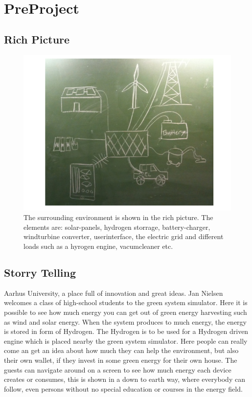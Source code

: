 \section{PreProject}
\subsection{Rich Picture}

\begin{figure}[h!]		%
 \begin{centering}
  \includegraphics[width=1\textwidth]{images/rich_picture.png}
   \caption{The surrounding environment is shown in the rich picture. The
 			 elements are: solar-panels, hydrogen storrage, battery-charger, windturbine
 			 converter, userinterface, the electric grid and different loads such as a
 			 hyrogen engine, vacumcleaner etc. }
 \end{centering}
\end{figure}

\subsection{Storry Telling}
Aarhus University, a place full of innovation and great ideas. Jan Nielsen
welcomes a class of high-school students to the green system simulator. Here it
is possible to see how much energy you can get out of green energy harvesting
such as wind and solar energy. When the system produces to much energy, the 
energy is stored in form of Hydrogen. The Hydrogen is to be used for a Hydrogen
driven engine which is placed nearby the green system simulator. Here people can
really come an get an idea about how much they can help the environment, but
also their own wallet, if they invest in some green energy for their own house.
The guests can navigate around on a screen to see how much energy each device 
creates or consumes, this is shown in a down to earth way, where everybody can follow, 
even persons without no special education or courses in the energy field.
